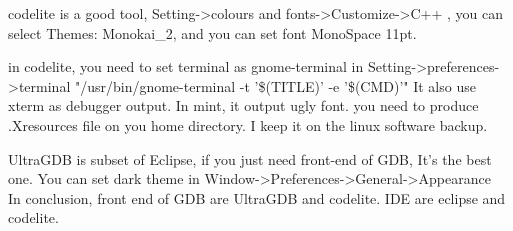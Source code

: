 \documentclass[paper=8.5in:11in, twoside, 12pt, pagesize=pdftex]{book}
\begin{document}
codelite is a good tool, Setting->colours and fonts->Customize->C++ , you can select Themes: Monokai\_2, and you can set font MonoSpace 11pt.  

in codelite, you need to set terminal as gnome-terminal in Setting->preferences->terminal "/usr/bin/gnome-terminal -t '\$(TITLE)' -e '\$(CMD)'"
It also use xterm as debugger output. In mint, it output ugly font.  you need to produce .Xresources file on you home directory.  I keep it on the linux software backup. 

UltraGDB is subset of Eclipse, if you just need front-end of GDB, It's the best one. You can set dark theme in Window->Preferences->General->Appearance \\

In conclusion,  front end of GDB are UltraGDB and codelite. IDE are eclipse and codelite.
\end{document}
